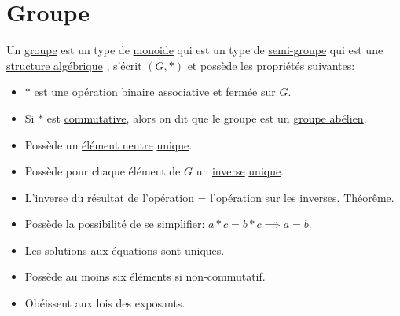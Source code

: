 \documentclass[12pt]{book}
\newcommand\todo[1]{\phantom{#1}}
\theoremstyle{definition}
\begin{document}
\section{Groupe}
Un \hyperref[def:groupe]{groupe} est un type de \hyperref[def:monoide]{monoide} qui est un type de \hyperref[def:semi_groupe]{semi-groupe} qui est une \hyperref[def:structure_algebrique]{structure algébrique}
, s'écrit $(G, \ast)$ et possède les propriétés suivantes:
\begin{itemize}
    \item $\ast$ est une \hyperref[def:operation_binaire]{opération binaire} \hyperref[def:associativite]{associative} et \hyperref[def:fermeture]{fermée} sur $G$.
    \item Si $\ast$ est \hyperref[def:commutativite]{commutative}, alors on dit que le groupe est un \hyperref[def:groupe_abelien]{groupe abélien}.
    \item Possède un \hyperref[def:neutre]{élément neutre} \hyperref[thm:neutre_unique]{unique}.
    \item Possède pour chaque élément de $G$ un \hyperref[def:inverse]{inverse} \hyperref[thm:inverse_unique]{unique}.
    \item L'inverse du résultat de l'opération = l'opération sur les inverses. Théorême.
    \item Possède la possibilité de se simplifier: $a \ast c = b \ast c \implies a = b$.
    \item Les solutions aux équations sont uniques.
    \item Possède au moins six éléments si non-commutatif.
    \item Obéissent aux lois des exposants.
\end{itemize}
\todo{Add links to def and thm}
\end{document}
